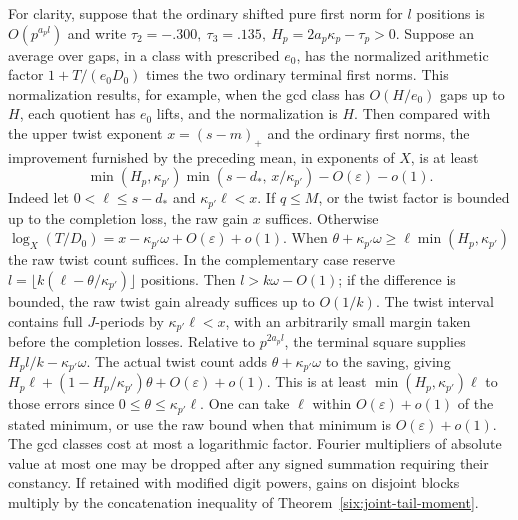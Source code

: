 \documentclass[11pt,a4paper]{article}
\theoremstyle{paperplain}
\numberwithin{equation}{section}
\begin{document}
For clarity, suppose that the ordinary shifted pure first
norm for \(l\) positions is \(O(p^{a_p l})\) and write
\(\tau_2=-.300,\ \tau_3=.135,\ H_p=2a_p\kappa_p-\tau_p>0\).
Suppose an average over gaps, in a class with prescribed
\(e_0\), has the normalized arithmetic factor
\(1+T/(e_0D_0)\) times the two ordinary terminal first
norms. This normalization results, for example, when the
gcd class has \(O(H/e_0)\) gaps up to \(H\), each quotient
has \(e_0\) lifts, and the normalization is \(H\).
Then compared with the upper twist exponent \(x=(s-m)_+\)
and the ordinary first norms, the improvement furnished by
the preceding mean, in exponents of \(X\), is at least
\[
 \min(H_p,\kappa_{p'})\min(s-d_*,\,x/\kappa_{p'})
   -O(\varepsilon)-o(1).
\]
Indeed let \(0<\ell\le s-d_*\) and \(\kappa_{p'}\ell<x\).
If \(q\le M\), or the twist factor is bounded up to the
completion loss, the raw gain \(x\) suffices. Otherwise
\(\log_X(T/D_0)=x-\kappa_{p'}\omega+O(\varepsilon)+o(1)\).
When \(\theta+\kappa_{p'}\omega\ge
\ell\min(H_p,\kappa_{p'})\) the raw twist count suffices.
In the complementary case reserve
\(l=\lfloor k(\ell-\theta/\kappa_{p'})\rfloor\) positions.
Then \(l>k\omega-O(1)\); if the difference is bounded,
the raw twist gain already suffices up to \(O(1/k)\).
The twist interval contains full \(J\)-periods by
\(\kappa_{p'}\ell<x\), with an arbitrarily small margin 
taken before the completion losses.
Relative to \(p^{2a_p l}\), the terminal square supplies
\(H_p l/k-\kappa_{p'}\omega\). The actual twist count adds
\(\theta+\kappa_{p'}\omega\) to the saving, giving
\(H_p\ell+(1-H_p/\kappa_{p'})\theta+O(\varepsilon)+o(1)\).
This is at least \(\min(H_p,\kappa_{p'})\ell\) to those
errors since \(0\le\theta\le\kappa_{p'}\ell\).
One can take \(\ell\) within \(O(\varepsilon)+o(1)\) of the
stated minimum, or use the raw bound when that minimum is
\(O(\varepsilon)+o(1)\). The gcd classes cost at most a
logarithmic factor. Fourier multipliers of absolute value
at most one may be dropped after any signed summation
requiring their constancy. If retained with modified digit
powers, gains on disjoint blocks multiply by the
concatenation inequality of Theorem~\ref{six:joint-tail-moment}.
\end{document}

